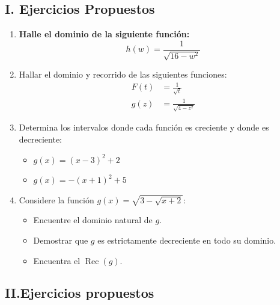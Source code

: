 \documentclass[letterpaper, 12pt]{article}
\begin{document}
\newpage



\subsection*{I. Ejercicios Propuestos}

\begin{enumerate}[label=\color{azulFuerte}\bfseries 1.\arabic*., leftmargin=*, itemsep=1em]

\item \textbf{Halle el dominio de la siguiente función:}
  $$h(w)=\frac{1}{\sqrt{16-w^{2}}}$$

\item Hallar el dominio y recorrido de las siguientes funciones:
    \begin{align*}
        F(t) &= \frac{1}{\sqrt{t}} \\[1ex]
        g(z) &= \frac{1}{\sqrt{4-z^{2}}}
    \end{align*}

\item Determina los intervalos donde cada función es creciente y donde es decreciente:
    \begin{itemize}
              \item $g(x) = (x-3)^{2}+2$
              \item $g(x) = -(x+1)^{2}+5$
    \end{itemize}

\item Considere la función $g(x)=\sqrt{3-\sqrt{x+2}}$:
    \begin{itemize}
        \item Encuentre el dominio natural de $g$.
        \item Demostrar que $g$ es estrictamente decreciente en todo su dominio.
        \item Encuentra el $\operatorname{Rec}(g)$.
    \end{itemize}

\end{enumerate}

\vspace{1cm}
\newpage

\subsection*{II.Ejercicios propuestos}
\end{document}

